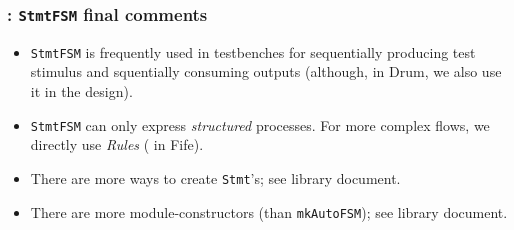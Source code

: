 \begin{frame}[fragile]
\frametitle{{\BSV}: {\tt StmtFSM} final comments}

\footnotesize

\begin{itemize}
        
 \item {\tt StmtFSM} is frequently used in testbenches for
        sequentially producing test stimulus and squentially consuming
        outputs (although, in Drum, we also use it in the design).

 \item {\tt StmtFSM} can only express \emph{structured} processes.
       For more complex flows, we directly use {\BSV} \emph{Rules}
       ({\eg} in Fife).

\end{itemize}

\PAUSE{\vspace{5ex}}

\begin{itemize}
        
 \item There are more ways to create {\tt Stmt}'s; see {\bsc} library document.

 \item There are more module-constructors (than {\tt mkAutoFSM}); see {\bsc} library document.

\end{itemize}

\end{frame}






